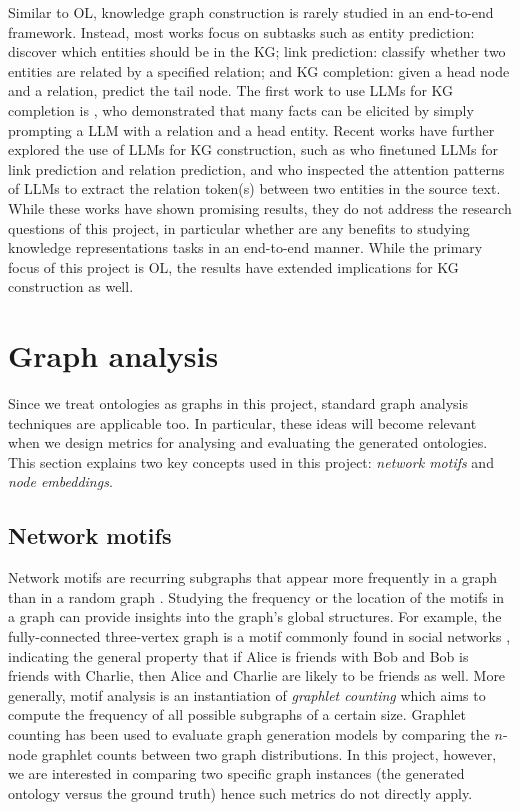 Similar to OL, knowledge graph construction is rarely studied in an end-to-end framework. Instead, most works focus on subtasks such as entity prediction: discover which entities should be in the KG; link prediction: classify whether two entities are related by a specified relation; and KG completion: given a head node and a relation, predict the tail node.  The first work to use LLMs for KG completion is \citet{petroni2019language}, who demonstrated that many facts can be elicited by simply prompting a LLM with a relation and a head entity. Recent works have further explored the use of LLMs for KG construction, such as \citet{yao2023exploring} who finetuned LLMs for link prediction and relation prediction, and \citet{wang2020language} who inspected the attention patterns of LLMs to extract the relation token(s) between two entities in the source text. While these works have shown promising results, they do not address the research questions of this project, in particular whether are any benefits to studying knowledge representations tasks in an end-to-end manner. While the primary focus of this project is OL, the results have extended implications for KG construction as well.

\section{Graph analysis}

Since we treat ontologies as graphs in this project, standard graph analysis techniques are applicable too. In particular, these ideas will become relevant when we design metrics for analysing and evaluating the generated ontologies. This section explains two key concepts used in this project: \emph{network motifs} and \emph{node embeddings}.

\subsection{Network motifs}

Network motifs are recurring subgraphs that appear more frequently in a graph than in a random graph \cite{milo2002network}. Studying the frequency or the location of the motifs in a graph can provide insights into the graph's global structures. For example, the fully-connected three-vertex graph is a motif commonly found in social networks \cite{stone2019network}, indicating the general property that if Alice is friends with Bob and Bob is friends with Charlie, then Alice and Charlie are likely to be friends as well. More generally, motif analysis is an instantiation of \emph{graphlet counting} \cite{ribeiro2021survey} which aims to compute the frequency of all possible subgraphs of a certain size. Graphlet counting has been used to evaluate graph generation models \cite{you2018graphrnn} by comparing the $n$-node graphlet counts between two graph distributions. In this project, however, we are interested in comparing two specific graph instances (the generated ontology versus the ground truth) hence such metrics do not directly apply.


